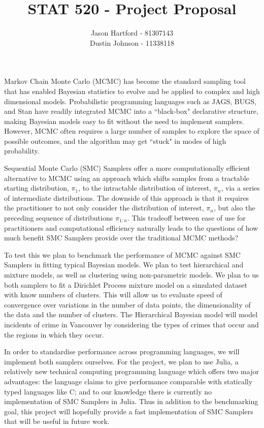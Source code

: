 \documentclass[11pt, oneside]{amsart}
\title{STAT 520 - Project Proposal}
\author{Jason Hartford - 81307143 \\
Dustin Johnson - 11338118}
\begin{document}
\maketitle



Markov Chain Monte Carlo (MCMC) has become the standard sampling tool that has enabled Bayesian statistics to evolve and be applied to complex and high dimensional models. Probabilistic programming languages such as JAGS, BUGS, and Stan have readily integrated MCMC into a ``black-box" declarative structure, making Bayesian models easy to fit without the need to implement samplers. However, MCMC often requires a large number of samples to explore the space of possible outcomes, and the algorithm may get ``stuck" in modes of high probability.

Sequential Monte Carlo (SMC) Samplers \cite{DelMoral2005} offer a more computationally efficient alternative to MCMC using an approach which shifts samples from a tractable starting distribution, $\pi_1$, to the intractable distribution of interest, $\pi_n$, via a series of intermediate distributions. The downside of this approach is that it requires the practitioner to not only consider the distribution of interest, $\pi_n$, but also the preceding sequence of distributions $\pi_{1:n}$. This tradeoff between ease of use for practitioners and computational efficiency naturally leads to the questions of how much benefit  SMC Samplers provide over the traditional MCMC methods?

To test this we plan to benchmark the performance of MCMC against SMC Samplers in fitting typical Bayesian models. We plan to test hierarchical and mixture models, as well as clustering using non-parametric models.  We plan to us both samplers to fit a Dirichlet Process mixture model on a simulated dataset with know numbers of clusters. This will allow us to evaluate speed of convergence over variations in the number of data points, the dimensionality of the data and the number of clusters. The Hierarchical Bayesian model will model incidents of crime in Vancouver by considering the types of crimes that occur and the regions in which they occur.

In order to standardise performance across programming languages, we will implement both samplers ourselves. For the project, we plan to use Julia, a relatively new technical computing programming language which offers two major advantages: the language claims to give performance comparable with statically typed languages like C; and to our knowledge there is currently no implementation of SMC Samplers in Julia. Thus in addition to the benchmarking goal, this project will hopefully provide a fast implementation of SMC Samplers that will be useful in future work.
\end{document}
